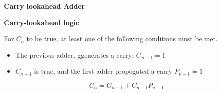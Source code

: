 

\textbf{Carry lookahead Adder}

\textbf{Carry-lookahead logic}

For $C_n$ to be true, at least one of the following conditions must be met.
\begin{itemize}
  \item The previous adder, ggenerates a carry: $G_{n-1} = 1$
  \item $C_{n-1}$ is true, and the first adder propogated a carry $P_{n-1} = 1$
\end{itemize}

\[C_n = G_{n-1} + C_{n-1}P_{n-1}\]


